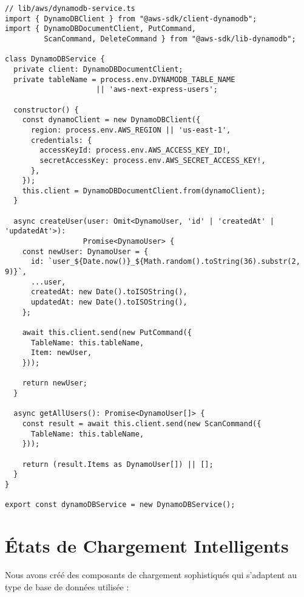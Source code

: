 \documentclass[12pt,a4paper]{report}
\begin{document}
\begin{lstlisting}[caption=Service DynamoDB avec AWS SDK v3]
// lib/aws/dynamodb-service.ts
import { DynamoDBClient } from "@aws-sdk/client-dynamodb";
import { DynamoDBDocumentClient, PutCommand, 
         ScanCommand, DeleteCommand } from "@aws-sdk/lib-dynamodb";

class DynamoDBService {
  private client: DynamoDBDocumentClient;
  private tableName = process.env.DYNAMODB_TABLE_NAME 
                     || 'aws-next-express-users';

  constructor() {
    const dynamoClient = new DynamoDBClient({
      region: process.env.AWS_REGION || 'us-east-1',
      credentials: {
        accessKeyId: process.env.AWS_ACCESS_KEY_ID!,
        secretAccessKey: process.env.AWS_SECRET_ACCESS_KEY!,
      },
    });
    this.client = DynamoDBDocumentClient.from(dynamoClient);
  }

  async createUser(user: Omit<DynamoUser, 'id' | 'createdAt' | 'updatedAt'>): 
                  Promise<DynamoUser> {
    const newUser: DynamoUser = {
      id: `user_${Date.now()}_${Math.random().toString(36).substr(2, 9)}`,
      ...user,
      createdAt: new Date().toISOString(),
      updatedAt: new Date().toISOString(),
    };

    await this.client.send(new PutCommand({
      TableName: this.tableName,
      Item: newUser,
    }));

    return newUser;
  }

  async getAllUsers(): Promise<DynamoUser[]> {
    const result = await this.client.send(new ScanCommand({
      TableName: this.tableName,
    }));

    return (result.Items as DynamoUser[]) || [];
  }
}

export const dynamoDBService = new DynamoDBService();
\end{lstlisting}

\section{États de Chargement Intelligents}

Nous avons créé des composants de chargement sophistiqués qui s'adaptent au type de base de données utilisée :
\end{document}
